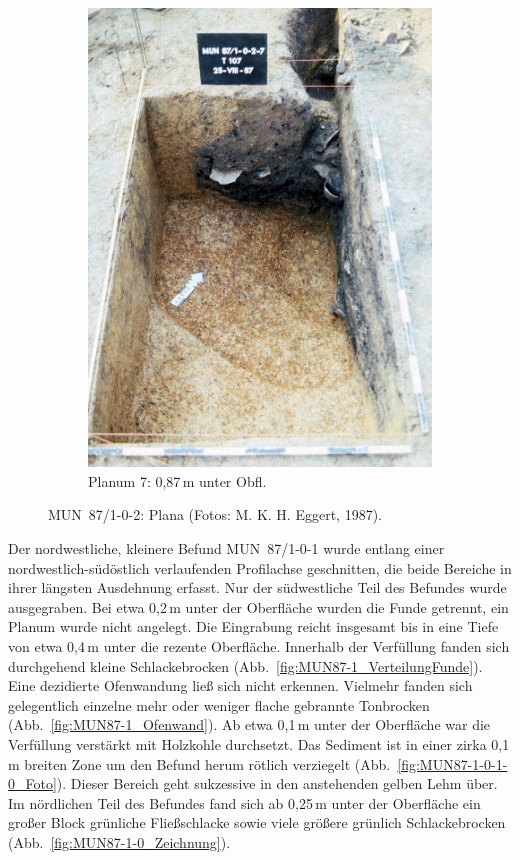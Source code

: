 \begin{figure}[p]
\begin{subfigure}[t]{0.32\textwidth}
		\includegraphics[width = \textwidth]{fig/MUN87-102_Pl7_E87-042-20.jpg}
		\caption{Planum 7: 0,87\,m unter Obfl.}
		\label{fig:MUN87-1-0-2_Pl_7}
	\end{subfigure}
	\caption{MUN~87/1-0-2: Plana (Fotos: M. K. H. Eggert, 1987).}
	\label{fig:MUN87-1-0-2_PlanaFotos}
\end{figure}

Der nordwestliche, kleinere Befund MUN~87/1-0-1 wurde entlang einer nordwestlich-südöstlich verlaufenden Profilachse geschnitten, die beide Bereiche in ihrer längsten Ausdehnung erfasst. Nur der südwestliche Teil des Befundes wurde ausgegraben. Bei etwa 0,2\,m unter der Oberfläche wurden die Funde getrennt, ein Planum wurde nicht angelegt. Die Eingrabung reicht insgesamt bis in eine Tiefe von etwa 0,4\,m unter die rezente Oberfläche. Innerhalb der Verfüllung fanden sich durchgehend kleine Schlackebrocken (Abb.~\ref{fig:MUN87-1_VerteilungFunde}). Eine dezidierte Ofenwandung ließ sich nicht erkennen. Vielmehr fanden sich gelegentlich einzelne mehr oder weniger flache gebrannte Tonbrocken (Abb.~\ref{fig:MUN87-1_Ofenwand}). Ab etwa 0,1\,m unter der Oberfläche war die Verfüllung verstärkt mit Holzkohle durchsetzt. Das Sediment ist in einer zirka 0,1\,m breiten Zone um den Befund herum rötlich verziegelt (Abb.~\ref{fig:MUN87-1-0-1-0_Foto}). Dieser Bereich geht sukzessive in den anstehenden gelben Lehm über. Im nördlichen Teil des Befundes fand sich ab 0,25\,m unter der Oberfläche ein großer Block grünliche Fließschlacke sowie viele größere grünlich Schlackebrocken (Abb.~\ref{fig:MUN87-1-0_Zeichnung}).

